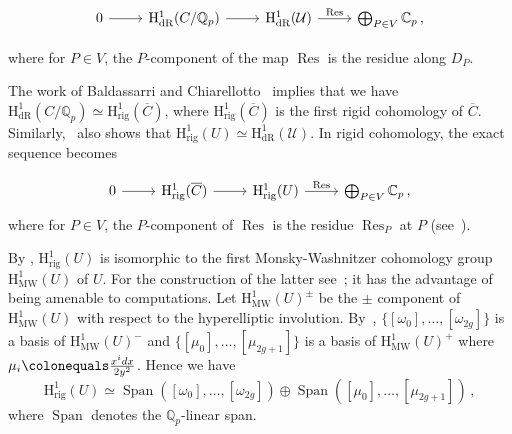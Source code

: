 \documentclass[11pt, a4paper]{amsart}
\newcommand{\Q}{\mathbb{Q}}
\newcommand{\C}{\mathbb{C}}
\newcommand{\calU}{\mathcal{U}}
\newcommand{\hdr}{\operatorname{H^1_{dR}}}
\newcommand{\hrig}{\operatorname{H^1_{rig}}}
\newcommand{\Span}{\operatorname{Span}}
\newcommand{\hmw}{\operatorname{H^1_{MW}}}
\newcommand{\Res}{\operatorname{Res}}
\theoremstyle{remark}
\numberwithin{equation}{section}
\newcommand{\sm}{{}}
\begin{document}
\begin{equation}\label{eq:Besser-Exact-Sequence}
\begin{tikzcd}
    \displaystyle  0 \arrow[r] & \hdr(C/\Q_p) \arrow[r] &
  \hdr(\calU) \arrow[r, "\Res"] & \bigoplus_{\substack{P\in
  V}}\C_p\,,
\end{tikzcd}
\end{equation} 
\sm{where for $P\in V$, the $P$-component of the map $\Res$ is the residue
  along $D_P$.

The work of Baldassarri and Chiarellotto~\cite{Baldassarri-Chiarellotto}
implies that we have
$\hdr(C/\Q_p)\simeq \hrig(\overline{C})$, where
$\hrig(\overline{C})$ is the first rigid cohomology of $\overline{C}$.
Similarly,~\cite{Baldassarri-Chiarellotto} also shows that
$\hrig(U)\simeq \hdr(\calU)$. In rigid cohomology, the exact sequence
becomes } 
\begin{equation}\label{eq:Cohomology-Exact-Sequence}
\begin{tikzcd}
\displaystyle  0 \arrow[r] & \hrig(\overline{C}) \arrow[r] &
  \hrig(U) \arrow[r, "\Res"] & \bigoplus_{\substack{P\in
  V}}\C_p\,,
\end{tikzcd}
\end{equation} 
\sm{
where for $P\in V$, the $P$-component of $\Res$ is the residue $\Res_P$ at
$P$ (see~\cite[Theorem 3.11]{Tuitman-P1-two}).}

By
  \cite[Proposition 1.10]{Berthelot-isomorphism-rigid-MW}, $\hrig(U)$ is isomorphic to  the first Monsky-Washnitzer
    cohomology group $\hmw(U)$ of $U$. \sm{For the construction of the latter see~\cite{Marius-MW-Cohomology}; it has the advantage of
    being amenable to computations.
Let $\hmw(U)^{\pm}$ be the $\pm$ component of $\hmw(U)$ with respect to the hyperelliptic involution. 
By~\cite[\S3.2]{Harrison-Even-Deg-MW}, $\{[\omega_0], \ldots,[\omega_{2g}]\}$
is a basis of $\hmw(U)^-$ and $\{ [\mu_0],\ldots, [\mu_{2g+1}]\}$ is a basis of $\hmw(U)^+$ 
where $\mu_i \colonequals \frac{x^idx}{2y^2}$.
Hence we have}
\begin{equation}\label{eq:H1MW-even-basis}
\hrig(U)\simeq\Span([\omega_0],\ldots,[\omega_{2g}])\oplus\Span([\mu_0],\ldots,[\mu_{2g+1}])\,,
\end{equation}
    \sm{where $\Span$ denotes the $\Q_p$-linear span.}


\end{document}
